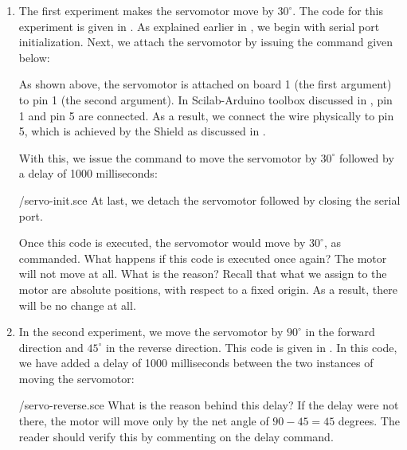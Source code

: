 \begin{enumerate}
  \item The first experiment makes the servomotor move by $30^\circ$. The code for this experiment is
        given in . As explained earlier in , 
        we begin with serial port initialization.
        Next, we attach the servomotor by issuing the command given below:
        
        As shown above, the servomotor is attached on board 1 (the first argument)
        to pin 1 (the second argument).  In Scilab-Arduino toolbox discussed 
        in , pin 1 and pin 5 are connected. As a result, we connect the wire physically to
        pin 5, which is achieved by the Shield as discussed in .
        
        With this, we issue the command to move the servomotor by $30^\circ$ followed by a delay of 
        1000 milliseconds:
        
        {\LocSERscicode/servo-init.sce}
        At last, we  detach the servomotor followed by closing the serial port. 
        
        Once this code is executed, the servomotor would move by
        $30^\circ$, as commanded.  What happens if this code is executed
        once again?  The motor will not move at all.  What is the reason?
        Recall that what we assign to the motor are absolute positions, with
        respect to a fixed origin.  As a result, there will be no change at
        all. 
        
  \item In the second experiment, we move the servomotor by $90^\circ$ in the
        forward direction and $45^\circ$ in the reverse direction.  This
        code is given in .  In this code, 
        we have added a delay of 1000 milliseconds between the two instances of 
        moving the servomotor: 
        
        {\LocSERscicode/servo-reverse.sce}
        What is the reason behind this delay?  If the delay were not
        there, the motor will move only by the net angle of $90-45 = 45$
        degrees.  The reader should verify this by commenting on the delay
        command. 
        

\end{enumerate}
